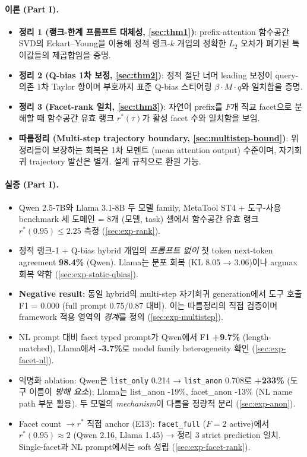 \documentclass[11pt]{article}
\theoremstyle{definition}
\begin{document}
\paragraph{이론 (Part I).}
\begin{itemize}[leftmargin=*]
\item \textbf{정리 1 (랭크-한계 프롬프트 대체성, \cref{sec:thm1})}: prefix-attention 함수공간 SVD의 Eckart--Young을 이용해 정적 랭크-$k$ 개입의 정확한 $L_2$ 오차가 폐기된 특이값들의 제곱합임을 증명.
\item \textbf{정리 2 (Q-bias 1차 보정, \cref{sec:thm2})}: 정적 절단 너머 leading 보정이 query-의존 1차 Taylor 항이며 부호까지 표준 Q-bias 스티어링 $\beta\cdot M\cdot q$와 일치함을 증명.
\item \textbf{정리 3 (Facet-rank 일치, \cref{sec:thm3})}: 자연어 prefix를 $F$개 직교 facet으로 분해할 때 함수공간 유효 랭크 $r^*(\tau)$가 활성 facet 수와 일치함을 보임.
\item \textbf{따름정리 (Multi-step trajectory boundary, \cref{sec:multistep-bound})}: 위 정리들이 보장하는 회복은 1차 모멘트 (mean attention output) 수준이며, 자기회귀 trajectory 발산은 별개. 설계 규칙으로 환원 가능.
\end{itemize}

\paragraph{실증 (Part I).}
\begin{itemize}[leftmargin=*]
\item Qwen 2.5-7B와 Llama 3.1-8B 두 모델 family, MetaTool ST4 + 도구-사용 benchmark 세 도메인 = 8개 (모델, task) 셀에서 함수공간 유효 랭크 $r^*(0.95) \le 2.25$ 측정 (\cref{sec:exp-rank}).
\item 정적 랭크-1 + Q-bias hybrid 개입의 \emph{프롬프트 없이} 첫 token next-token agreement \textbf{98.4\%} (Qwen). Llama는 분포 회복 (KL 8.05 → 3.06)이나 argmax 회복 약함 (\cref{sec:exp-static-qbias}).
\item \textbf{Negative result}: 동일 hybrid의 multi-step 자기회귀 generation에서 도구 호출 F1 = 0.000 (full prompt 0.75/0.87 대비). 이는 따름정리의 직접 검증이며 framework 적용 영역의 \emph{경계}를 정의 (\cref{sec:exp-multistep}).
\item NL prompt 대비 facet typed prompt가 Qwen에서 F1 \textbf{+9.7\%} (length-matched), Llama에서 \textbf{-3.7\%}로 model family heterogeneity 확인 (\cref{sec:exp-facet-nl}).
\item 익명화 ablation: Qwen은 \texttt{list\_only} 0.214 → \texttt{list\_anon} 0.708로 \textbf{+233\%} (도구 이름이 \emph{방해 요소}); Llama는 list\_anon -19\%, facet\_anon -13\% (NL name path 부분 활용). 두 모델의 \emph{mechanism}이 다름을 정량적 분리 (\cref{sec:exp-anon}).
\item Facet count $\to r^*$ 직접 anchor (E13): \texttt{facet\_full} ($F=2$ active)에서 $r^*(0.95) \approx 2$ (Qwen 2.16, Llama 1.45) → 정리 3 strict prediction 일치. Single-facet과 NL prompt에서는 soft 성립 (\cref{sec:exp-facet-rank}).
\end{itemize}
\end{document}

